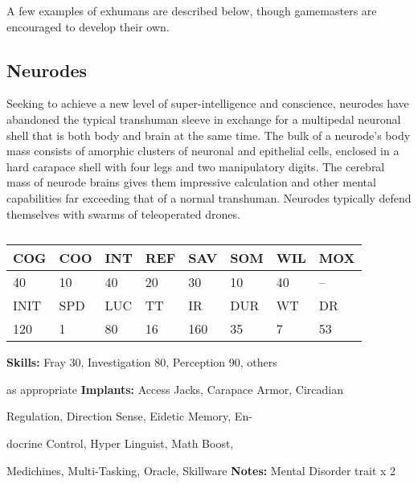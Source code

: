 A few examples of exhumans are described below, 
though gamemasters are encouraged to develop 
their own.

\subsection{Neurodes}

Seeking to achieve a new level of super-intelligence 
and conscience, neurodes have abandoned the typical
transhuman sleeve in exchange for a multipedal
neuronal shell that is both body and brain at the same 
time. The bulk of a neurode's body mass consists of 
amorphic clusters of neuronal and epithelial cells, enclosed
in a hard carapace shell with four legs and two
manipulatory digits. The cerebral mass of neurode 
brains gives them impressive calculation and other 
mental capabilities far exceeding that of a normal 
transhuman. Neurodes typically defend themselves 
with swarms of teleoperated drones.

\begin{table}
\caption{}
\begin{tabular}{|l|l|l|l|l|l|l|l|}
\hline
COG & COO & INT & REF & SAV & SOM & WIL & MOX \\
\hline
40 & 10 & 40 & 20 & 30 & 10 & 40 & -- \\
\hline
INIT & SPD & LUC & TT & IR & DUR & WT & DR \\
\hline
120 & 1 & 80 & 16 & 160 & 35 & 7 & 53 \\
\hline
\end{tabular}
\end{table}

\textbf{Skills:} Fray 30, Investigation 80, Perception 90, others 

as appropriate
\textbf{Implants:} Access Jacks, Carapace Armor, Circadian 

Regulation, Direction Sense, Eidetic Memory, En-

docrine Control, Hyper Linguist, Math Boost, 

Medichines, Multi-Tasking, Oracle, Skillware
\textbf{Notes:} Mental Disorder trait x 2

